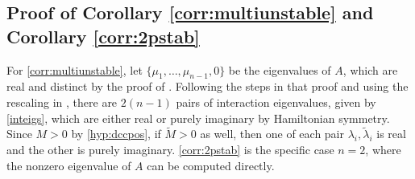 \documentclass[12pt]{article}
\begin{document}
\subsection{Proof of Corollary \ref{corr:multiunstable} and Corollary \ref{corr:2pstab}}

For \cref{corr:multiunstable}, let $\{ \mu_1,\dots,\mu_{n-1}, 0\}$ be the eigenvalues of $A$, which are real and distinct by the proof of \cite[Theorem 5]{Parker2020}. Following the steps in that proof and using the rescaling in \cite[Theorem 3]{Sandstede1998}, there are $2(n-1)$ pairs of interaction eigenvalues, given by \cref{inteigs}, which are either real or purely imaginary by Hamiltonian symmetry. Since $M > 0$ by \cref{hyp:dccpos}, if $\tilde{M} > 0$ as well, then one of each pair $\lambda_i, \tilde{\lambda}_i$ is real and the other is purely imaginary. \cref{corr:2pstab} is the specific case $n = 2$, where the nonzero eigenvalue of $A$ can be computed directly.

% 

\end{document}
